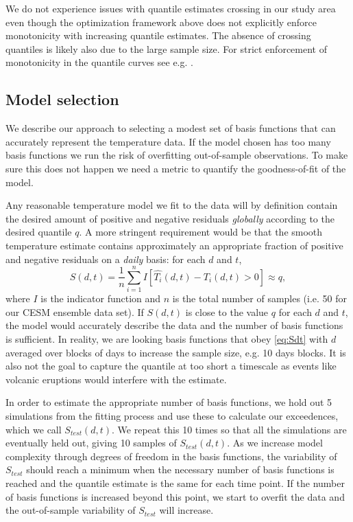 \documentclass{ametsoc}
\begin{document}
We do not experience issues with quantile estimates crossing in our study area even though the optimization framework above does not explicitly enforce monotonicity with increasing quantile estimates. The absence of crossing quantiles is likely also due to the large sample size. For strict enforcement of monotonicity in the quantile curves see e.g. \citet{bondell2010noncrossing}.

\subsection{Model selection}
 We describe our approach to selecting a modest set of basis functions that can accurately represent the temperature data. If the model chosen has too many basis functions we run the risk of overfitting out-of-sample observations. To make sure this does not happen we need a metric to quantify the goodness-of-fit of the model. 

 Any reasonable temperature model we fit to the data will by definition contain the desired amount of positive and negative residuals \emph{globally} according to the desired quantile $q$. A more stringent requirement would be that the smooth temperature estimate contains approximately an appropriate fraction of positive and negative residuals on a \emph{daily} basis: for each $d$ and $t$, 
\begin{equation}
S(d,t) = \frac{1}{n}\sum_{i=1}^n I\left[\hat{T_i}(d,t) - T_i(d,t) > 0\right] \approx q, 
\label{eq:Sdt}	
\end{equation}
 where $I$ is the indicator function and $n$ is the total number of samples (i.e. 50 for our CESM ensemble data set). If $S(d,t)$ is close to the value $q$ for each $d$ and $t$, the model would accurately describe the data and the number of basis functions is sufficient. In reality, we are looking basis functions that obey \ref{eq:Sdt} with $d$ averaged over blocks of days to increase the sample size, e.g. 10 days blocks. It is also not the goal to capture the quantile at too short a timescale as events like volcanic eruptions would interfere with the estimate.

 In order to estimate the appropriate number of basis functions, we hold out 5 simulations from the fitting process and use these to calculate our exceedences, which we call $S_{test}(d,t)$. We repeat this 10 times so that all the simulations are eventually held out, giving 10 samples of $S_{test}(d,t)$. As we increase model complexity through degrees of freedom in the basis functions, the variability of $S_{test}$ should reach a minimum when the necessary number of basis functions is reached and the quantile estimate is the same for each time point. If the number of basis functions is increased beyond this point, we start to overfit the data and the out-of-sample variability of $S_{test}$ will increase. 
\end{document}
